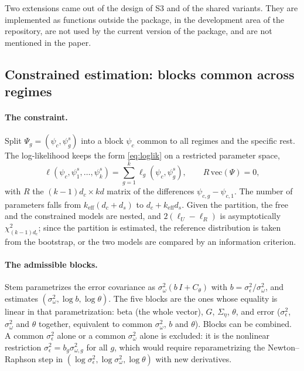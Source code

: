 \documentclass[11pt]{article}
\newcommand{\Stem}{\textsf{Stem}}
\begin{document}
Two extensions came out of the design of S3 and of the shared variants. They are implemented as functions outside the package, in the development area of the repository, are not used by the current version of the package, and are not mentioned in the paper.

\subsection{Constrained estimation: blocks common across regimes}\label{sec:dev:constr}

\paragraph{The constraint.} Split $\Psi_g = (\psi_c, \psi^s_g)$ into a block $\psi_c$ common to all regimes and the specific rest. The log-likelihood keeps the form \eqref{eq:loglik} on a restricted parameter space,
\[
  \ell(\psi_c, \psi^s_1, \dots, \psi^s_k) = \sum_{g=1}^k \ell_g(\psi_c, \psi^s_g),
  \qquad R\, \mathrm{vec}(\Psi) = 0,
\]
with $R$ the $(k-1)d_c \times k d$ matrix of the differences $\psi_{c,g} - \psi_{c,1}$. The number of parameters falls from $k_{\mathrm{eff}}(d_c + d_s)$ to $d_c + k_{\mathrm{eff}} d_s$. Given the partition, the free and the constrained models are nested, and $2(\ell_U - \ell_R)$ is asymptotically $\chi^2_{(k-1)d_c}$; since the partition is estimated, the reference distribution is taken from the bootstrap, or the two models are compared by an information criterion.

\paragraph{The admissible blocks.} \Stem{} parametrizes the error covariance as $\sigma^2_\omega(b\,I + C_\theta)$ with $b = \sigma^2_\epsilon/\sigma^2_\omega$, and estimates $(\sigma^2_\omega, \log b, \log\theta)$. The five blocks are the ones whose equality is linear in that parametrization: beta (the whole vector), $G$, $\Sigma_\eta$, $\theta$, and error ($\sigma^2_\epsilon$, $\sigma^2_\omega$ and $\theta$ together, equivalent to common $\sigma^2_\omega$, $b$ and $\theta$). Blocks can be combined. A common $\sigma^2_\epsilon$ alone or a common $\sigma^2_\omega$ alone is excluded: it is the nonlinear restriction $\sigma^2_{\epsilon} = b_g \sigma^2_{\omega,g}$ for all $g$, which would require reparametrizing the Newton--Raphson step in $(\log\sigma^2_\epsilon, \log\sigma^2_\omega, \log\theta)$ with new derivatives.
\end{document}
